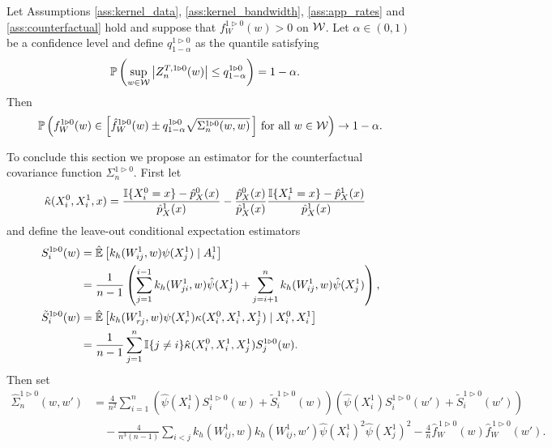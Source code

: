 \begin{theorem}
  \label{thm:counterfactual_infeasible_ucb}

  Let Assumptions \ref{ass:kernel_data}, \ref{ass:kernel_bandwidth},
  \ref{ass:app_rates} and \ref{ass:counterfactual}
  hold and suppose that $f_W^{1 \triangleright 0}(w) > 0$ on $\mathcal{W}$.
  Let $\alpha \in (0,1)$ be a confidence level
  and define $q^{1 \triangleright 0}_{1-\alpha}$ as the quantile
  satisfying
  \begin{align*}
    \mathbb{P}\left(
      \sup_{w \in \mathcal{W}}
      \left| Z_n^{T,1 \triangleright 0}(w) \right|
      \leq q^{1 \triangleright 0}_{1-\alpha}
    \right)
    &=
    1 - \alpha.
  \end{align*}
  Then
  \begin{align*}
    \mathbb{P}\left(
      f_W^{1 \triangleright 0}(w)
      \in
      \left[
        \hat f_W^{1 \triangleright 0}(w)
        \pm
        q^{1 \triangleright 0}_{1-\alpha}
        \sqrt{\Sigma_n^{1 \triangleright 0}(w,w)}
      \, \right]
      \, \textup{for all }
      w \in \mathcal{W}
    \right)
    \to 1 - \alpha.
  \end{align*}
\end{theorem}
%
To conclude this section we propose an estimator
for the counterfactual covariance function
$\Sigma_n^{1 \triangleright 0}$.
First let
%
\begin{align*}
  \hat\kappa(X_i^0, X_i^1, x)
  &=
  \frac{\mathbb{I}\{X_i^0 = x\} - \hat p_X^0(x)}{\hat p_X^1(x)}
  - \frac{\hat p_X^0(x)}{\hat p_X^1(x)}
  \frac{\mathbb{I}\{X_i^1 = x\} - \hat p_X^1(x)}{\hat p_X^1(x)}
\end{align*}
%
and define the leave-out conditional expectation estimators
%
\begin{align*}
  S_i^{1 \triangleright 0}(w)
  &=
  \hat{\mathbb{E}}\left[
    k_h(W_{i j}^1,w) \psi(X_j^1) \mid A_i^1
  \right] \\
  &=
  \frac{1}{n-1}
  \left(
    \sum_{j=1}^{i-1}
    k_h(W_{j i}^1,w) \hat\psi(X_j^1)
    + \sum_{j=i+1}^n
    k_h(W_{i j}^1,w) \hat\psi(X_j^1)
  \right), \\
  \tilde S_i^{1 \triangleright 0}(w)
  &=
  \hat{\mathbb{E}}\left[
    k_h(W_{r j}^1,w) \psi(X_r^1)
    \kappa(X_i^0, X_i^1, X_j^1) \mid X_i^0, X_i^1
  \right] \\
  &=
  \frac{1}{n-1}
  \sum_{j=1}^n
  \mathbb{I}\{j \neq i\}
  \hat\kappa(X_i^0, X_i^1, X_j^1)
  S_j^{1 \triangleright 0}(w).
\end{align*}
%
Then set
%
\begin{align*}
  \hat\Sigma_n^{1 \triangleright 0}(w,w')
  &=
  \frac{4}{n^2}
  \sum_{i=1}^n
  \left(
    \hat\psi(X_i^1)
    S_i^{1 \triangleright 0}(w)
    + \tilde S_i^{1 \triangleright 0}(w)
  \right)
  \left(
    \hat\psi(X_i^1)
    S_i^{1 \triangleright 0}(w')
    + \tilde S_i^{1 \triangleright 0}(w')
  \right) \\
  &\quad-
  \frac{4}{n^3(n-1)}
  \sum_{i<j}
  k_h(W_{i j}^1, w)
  k_h(W_{i j}^1, w')
  \hat\psi(X_i^1)^2
  \hat\psi(X_j^1)^2
  - \frac{4}{n}
  \hat f_W^{\,1 \triangleright 0}(w)
  \hat f_W^{\,1 \triangleright 0}(w').
\end{align*}
